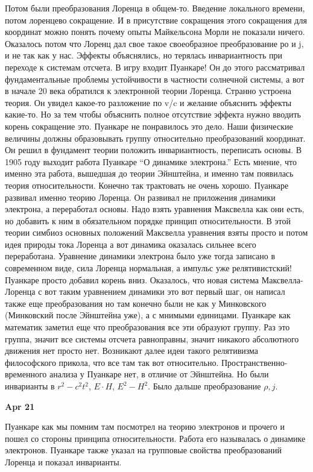 \documentclass[a4paper, 12pt]{article}
\begin{document}
Потом были преобразования Лоренца в общем-то. Введение локального 
времени, потом лоренцево сокращение. И в присутствие сокращения этого 
сокращения для координат можно понять почему опыты Майкельсона Морли не 
показали ничего. Оказалось потом что Лоренц дал свое такое своеобразное 
преобразование ро и j, и не так как у нас. Эффекты объяснялись, но 
терялась инвариантность при переходе к системам отсчета. В игру входит 
Пуанкаре! Он до этого рассматривал фундаментальные проблемы устойчивости 
в частности солнечной системы, а вот в начале 20 века обратился 
к электронной теории Лоренца. Странно устроена теория. Он увидел 
какое-то разложение по v/c и желание объяснить эффекты какие-то. Но за 
тем чтобы объяснить полное отсутствие эффекта нужно вводить корень 
сокращение это. Пуанкаре не понравилось это дело. Наши физические 
величины должны образовывать группу относительно преобразований 
координат. Он решил в фундамент теории положить инвариантность, 
переписать основы. В 1905 году выходит работа Пуанкаре ``О динамике 
электрона.'' Есть мнение, что именно эта работа, вышедшая до теории 
Эйнштейна, и именно там появилась теория относительности. Конечно так 
трактовать не очень хорошо. Пуанкаре развивал именно теорию Лоренца. Он 
развивал не приложения динамики электрона, а переработал основы. Надо 
взять уравнения Максвелла как они есть, но добавить к ним в обязательном 
порядке принцип относительности. В этой теории симбиоз основных 
положений Максвелла уравнения взяты просто и потом идея природы тока 
Лоренца а вот динамика оказалась сильнее всего переработана. Уравнение 
динамики электрона было уже тогда записано в современном виде, сила 
Лоренца нормальная, а импульс уже релятивистский! Пуанкаре просто 
добавил корень вниз. Оказалось, что новая система Максвелла-Лоренца 
с вот таким уравнением динамики это вот первый шаг, он написал также еще 
преобразования но там конечно были не как у Минковского (Минковский 
после Эйнштейна уже), а с мнимыми единицами. Пуанкаре как математик 
заметил еще что преобразования все эти образуют группу. Раз это группа, 
значит все системы отсчета равноправны, значит никакого абсолютного 
движения нет просто нет. Возникают далее идеи такого релятивизма 
философского прикола, что все там так вот относительно. 
Пространственно-временного анализа у Пуанкаре нет, в отличие от 
Эйнштейна. Но были инварианты в $r^2 - c^2t^2$, $E\cdot H$, $E^2 - H^2$. 
Было дальше преобразование $\rho, j$.

\hfill \textbf{Apr 21}

Пуанкаре как мы помним там посмотрел на теорию электронов и прочего 
и пошел со стороны принципа относительности. Работа его называлась 
о динамике электронов. Пуанкаре также указал на групповые свойства 
преобразований Лоренца и показал инварианты.
\end{document}
